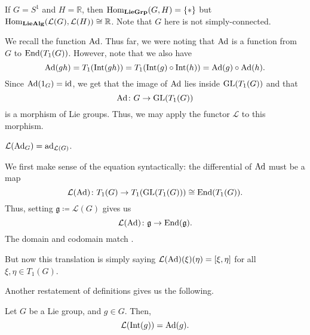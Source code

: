 \documentclass[12pt]{article}
\begin{document}
\begin{ex}
	If $G = S^{1}$ and $H = \mathbb{R}$, then $\operatorname{Hom}_{\mathbf{LieGrp}}(G, H) = \{\ast\}$ but $\operatorname{Hom}_{\mathbf{LieAlg}}(\mathcal{L}(G), \mathcal{L}(H)) \cong \mathbb{R}$. 
	Note that $G$ here is not simply-connected.
\end{ex}

We recall the function $\operatorname{Ad}$. 
Thus far, we were noting that $\operatorname{Ad}$ is a function from $G$ to $\operatorname{End}(T_{1}(G))$. 
However, note that we also have
\begin{equation*} 
	\operatorname{Ad}(gh) = T_{1}(\operatorname{Int}(gh)) = T_{1}(\operatorname{Int}(g) \circ \operatorname{Int}(h)) = \operatorname{Ad}(g) \circ \operatorname{Ad}(h).
\end{equation*}
Since $\operatorname{Ad}(1_{G}) = \operatorname{id}$, we get that the image of $\operatorname{Ad}$ lies inside $\operatorname{GL}(T_{1}(G))$ and that
\begin{equation*} 
	\operatorname{Ad} \colon G \to \operatorname{GL}(T_{1}(G))
\end{equation*}
is a morphism of Lie groups. 
Thus, we may apply the functor $\mathcal{L}$ to this morphism.
\begin{thm}
	\begin{center}
		$\mathcal{L}(\operatorname{Ad}_{G}) = \operatorname{ad}_{\mathcal{L}(G)}$.
	\end{center}
\end{thm}
\begin{sketch}
	We first make sense of the equation syntactically: the differential of $\operatorname{Ad}$ must be a map
	\begin{equation*} 
		\mathcal{L}(\operatorname{Ad}) \colon T_{1}(G) \to T_{1}(\operatorname{GL}(T_{1}(G))) \cong \operatorname{End}(T_{1}(G)).
	\end{equation*}
	Thus, setting $\mathfrak{g} \coloneqq \mathcal{L}(G)$ gives us
	\begin{equation*} 
		\mathcal{L}(\operatorname{Ad}) \colon \mathfrak{g} \to \operatorname{End}(\mathfrak{g}).
	\end{equation*}
	The domain and codomain match .

	But now this translation is simply saying $\mathcal{L}(\operatorname{Ad})(\xi)(\eta) = [\xi, \eta]$ for all $\xi, \eta \in T_{1}(G)$.
\end{sketch}

Another restatement of definitions gives us the following.
\begin{thm} \label{thm:L-INT-Ad}
	Let $G$ be a Lie group, and $g \in G$. Then,
	\begin{equation*} 
		\mathcal{L}(\operatorname{Int}(g)) = \operatorname{Ad}(g).
	\end{equation*}
\end{thm}
\end{document}
